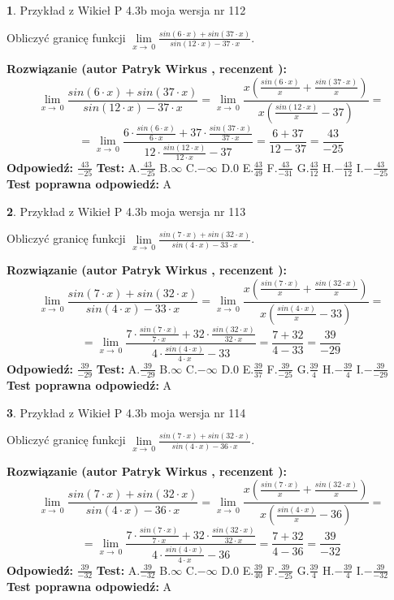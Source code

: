 \documentclass[12pt, a4paper]{article}
\theoremstyle{definition} %
\newtheorem{zad}{}
\newcommand{\zadStart}[1]{\begin{zad}#1\newline}
\newcommand{\zadStop}{\end{zad}}
\newcommand{\rozwStart}[2]{\noindent \textbf{Rozwiązanie (autor #1 , recenzent #2): }\newline}
\newcommand{\rozwStop}{\newline}
\newcommand{\odpStart}{\noindent \textbf{Odpowiedź:}\newline}
\newcommand{\odpStop}{\newline}
\newcommand{\testStart}{\noindent \textbf{Test:}\newline}
\newcommand{\testStop}{\newline}
\newcommand{\kluczStart}{\noindent \textbf{Test poprawna odpowiedź:}\newline}
\newcommand{\kluczStop}{\newline}
\begin{document}
\zadStart{Przykład z Wikieł P 4.3b moja wersja nr 112}


Obliczyć granicę funkcji $\lim\limits_{x\to\ 0}\frac{sin(6 \cdot x)+sin(37 \cdot x)}{sin(12 \cdot x)-37 \cdot x}$.
\zadStop
\rozwStart{Patryk Wirkus}{}
$$\lim\limits_{x\to\ 0}\frac{sin(6 \cdot x)+sin(37 \cdot x)}{sin(12 \cdot x)-37 \cdot x}=\lim\limits_{x\to\ 0}\frac{x(\frac{sin(6 \cdot x)}{x}+\frac{sin(37 \cdot x)}{x})}{x(\frac{sin(12 \cdot x)}{x}-37)}=$$
$$=\lim\limits_{x\to\ 0}\frac{6 \cdot \frac{sin(6 \cdot x)}{6 \cdot x}+37 \cdot \frac{sin(37 \cdot x)}{37 \cdot x}}{12 \cdot \frac{sin(12 \cdot x)}{12 \cdot x}-37}=\frac{6+37}{12-37} = \frac{43}{-25}$$
\rozwStop
\odpStart
$\frac{43}{-25}$
\odpStop
\testStart
A.$\frac{43}{-25}$
B.$\infty$
C.$-\infty$
D.$0$
E.$\frac{43}{49}$
F.$\frac{43}{-31}$
G.$\frac{43}{12}$
H.$-\frac{43}{12}$
I.$-\frac{43}{-25}$
\testStop
\kluczStart
A
\kluczStop



\zadStart{Przykład z Wikieł P 4.3b moja wersja nr 113}


Obliczyć granicę funkcji $\lim\limits_{x\to\ 0}\frac{sin(7 \cdot x)+sin(32 \cdot x)}{sin(4 \cdot x)-33 \cdot x}$.
\zadStop
\rozwStart{Patryk Wirkus}{}
$$\lim\limits_{x\to\ 0}\frac{sin(7 \cdot x)+sin(32 \cdot x)}{sin(4 \cdot x)-33 \cdot x}=\lim\limits_{x\to\ 0}\frac{x(\frac{sin(7 \cdot x)}{x}+\frac{sin(32 \cdot x)}{x})}{x(\frac{sin(4 \cdot x)}{x}-33)}=$$
$$=\lim\limits_{x\to\ 0}\frac{7 \cdot \frac{sin(7 \cdot x)}{7 \cdot x}+32 \cdot \frac{sin(32 \cdot x)}{32 \cdot x}}{4 \cdot \frac{sin(4 \cdot x)}{4 \cdot x}-33}=\frac{7+32}{4-33} = \frac{39}{-29}$$
\rozwStop
\odpStart
$\frac{39}{-29}$
\odpStop
\testStart
A.$\frac{39}{-29}$
B.$\infty$
C.$-\infty$
D.$0$
E.$\frac{39}{37}$
F.$\frac{39}{-25}$
G.$\frac{39}{4}$
H.$-\frac{39}{4}$
I.$-\frac{39}{-29}$
\testStop
\kluczStart
A
\kluczStop



\zadStart{Przykład z Wikieł P 4.3b moja wersja nr 114}


Obliczyć granicę funkcji $\lim\limits_{x\to\ 0}\frac{sin(7 \cdot x)+sin(32 \cdot x)}{sin(4 \cdot x)-36 \cdot x}$.
\zadStop
\rozwStart{Patryk Wirkus}{}
$$\lim\limits_{x\to\ 0}\frac{sin(7 \cdot x)+sin(32 \cdot x)}{sin(4 \cdot x)-36 \cdot x}=\lim\limits_{x\to\ 0}\frac{x(\frac{sin(7 \cdot x)}{x}+\frac{sin(32 \cdot x)}{x})}{x(\frac{sin(4 \cdot x)}{x}-36)}=$$
$$=\lim\limits_{x\to\ 0}\frac{7 \cdot \frac{sin(7 \cdot x)}{7 \cdot x}+32 \cdot \frac{sin(32 \cdot x)}{32 \cdot x}}{4 \cdot \frac{sin(4 \cdot x)}{4 \cdot x}-36}=\frac{7+32}{4-36} = \frac{39}{-32}$$
\rozwStop
\odpStart
$\frac{39}{-32}$
\odpStop
\testStart
A.$\frac{39}{-32}$
B.$\infty$
C.$-\infty$
D.$0$
E.$\frac{39}{40}$
F.$\frac{39}{-25}$
G.$\frac{39}{4}$
H.$-\frac{39}{4}$
I.$-\frac{39}{-32}$
\testStop
\kluczStart
A
\kluczStop
\end{document}

